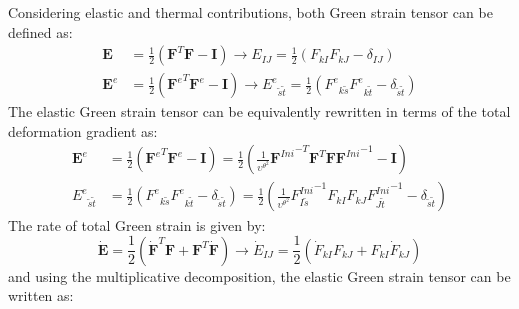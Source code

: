 \documentclass[oneside,11pt,times]{book}
\begin{document}
Considering elastic and thermal contributions, both Green strain tensor can be defined as:
\begin{equation}
\begin{aligned}
\boldsymbol{E}&=\frac{1}{2}\left({\bm{F}}^T\bm{F}-\bm{I} \right) \rightarrow {E}_{IJ} =\frac{1}{2}\left({F}_{kI}{F}_{kJ}-\delta_{IJ} \right)
\\
\boldsymbol{E}^e&=\frac{1}{2}\left({\bm{F}^e}^T\bm{F}^e-\bm{I} \right) \rightarrow {{E}^e}_{\tilde{s}\tilde{t}} =\frac{1}{2}\left({{F}^e}_{k\tilde{s}}{F^e}_{k\tilde{t}}-\delta_{\tilde{s}\tilde{t}} \right)
\end{aligned}
\label{multiDecomp}
\end{equation}
The elastic Green strain tensor can be equivalently rewritten in terms of the total deformation gradient as:
\begin{equation}
\begin{aligned}
\boldsymbol{E}^e&=\frac{1}{2}\left({\bm{F}^e}^T\bm{F}^e-\bm{I} \right)=\frac{1}{2}\left(\frac{1}{\upsilon^{{\theta}^2}}{\bm{F}^{Ini}}^{-T}{\bm{F}}^T\bm{F}{\bm{F}^{Ini}}^{-1}-\bm{I} \right) \\ {{E}^e}_{\tilde{s}\tilde{t}} &=\frac{1}{2}\left({{F}^e}_{k\tilde{s}}{F^e}_{k\tilde{t}}-\delta_{\tilde{s}\tilde{t}} \right)=\frac{1}{2}\left(\frac{1}{\upsilon^{{\theta}^2}}{{F}^{Ini}_{I\tilde{s}}}^{-1}{{F}}_{kI}{F}_{kJ}{{F}^{Ini}_{J\tilde{t}}}^{-1}-\delta_{\tilde{s}\tilde{t}}\right)
\end{aligned}
\end{equation}
The rate of total Green strain is given by:
\begin{equation}
\dot{\boldsymbol{E}}=\frac{1}{2}\left({\dot{\bm{F}}}^T\bm{F}+{\bm{F}}^T\dot{\bm{F}} \right) \rightarrow \dot{E}_{IJ} =\frac{1}{2}\left(\dot{F}_{kI}{F}_{kJ}+{F}_{kI}\dot{F}_{kJ} \right)
\label{multiDecomp}
\end{equation}
and using the multiplicative decomposition, the elastic Green strain tensor can be written as:
\end{document}
